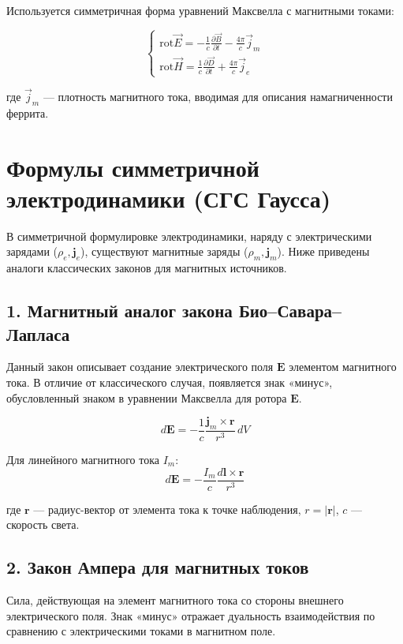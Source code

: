 \documentclass[a4paper,12pt]{article}
\begin{document}
Используется симметричная форма уравнений Максвелла с магнитными токами:

\begin{equation}
\begin{cases}
\text{rot} \vec{E} = -\frac{1}{c}\frac{\partial \vec{B}}{\partial t}
- \frac{4\pi}{c}\vec{j}_m \\
\text{rot} \vec{H} = \frac{1}{c}\frac{\partial \vec{D}}{\partial t}
+ \frac{4\pi}{c}\vec{j}_e
\end{cases}
\label{eq:maxwell_symmetric}
\end{equation}

где $\vec{j}_m$ --- плотность магнитного тока, вводимая для описания
намагниченности феррита.


\section*{Формулы симметричной электродинамики (СГС Гаусса)}

В симметричной формулировке электродинамики, наряду с электрическими зарядами ($\rho_e, \mathbf{j}_e$), существуют магнитные заряды ($\rho_m, \mathbf{j}_m$). Ниже приведены аналоги классических законов для магнитных источников.

\subsection*{1. Магнитный аналог закона Био--Савара--Лапласа}
Данный закон описывает создание электрического поля $\mathbf{E}$ элементом магнитного тока. В отличие от классического случая, появляется знак «минус», обусловленный знаком в уравнении Максвелла для ротора $\mathbf{E}$.

\begin{equation}
    d\mathbf{E} = -\frac{1}{c} \frac{\mathbf{j}_m \times \mathbf{r}}{r^3} \, dV
    \label{eq:magnetic_biot_savart}
\end{equation}

Для линейного магнитного тока $I_m$:
\begin{equation}
    d\mathbf{E} = -\frac{I_m}{c} \frac{d\mathbf{l} \times \mathbf{r}}{r^3}
    \label{eq:magnetic_biot_savart_linear}
\end{equation}

\noindent где $\mathbf{r}$ --- радиус-вектор от элемента тока к точке наблюдения, $r = |\mathbf{r}|$, $c$ --- скорость света.

\subsection*{2. Закон Ампера для магнитных токов}
Сила, действующая на элемент магнитного тока со стороны внешнего электрического поля. Знак «минус» отражает дуальность взаимодействия по сравнению с электрическими токами в магнитном поле.
\end{document}
